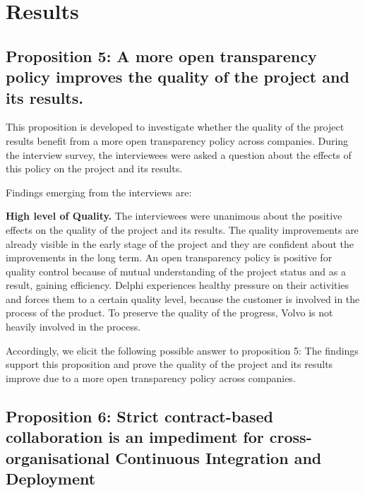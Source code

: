 \section{Results}\label{sec:results}

\subsection{Proposition 5: A more open transparency policy improves the quality of the project and its results.}

This proposition is developed to investigate whether the quality of the project results benefit from a more open transparency policy across companies. During the interview survey, the interviewees were asked a question about the effects of this policy on the project and its results. 

Findings emerging from the interviews are:

{\bf High level of Quality.} The interviewees were unanimous about the positive effects on the quality of the project and its results. The quality improvements are already visible in the early stage of the project and they are confident about the improvements in the long term. An open transparency policy is positive for quality control because of mutual understanding of the project status and as a result, gaining efficiency. Delphi experiences healthy pressure on their activities and forces them to a certain quality level, because the customer is involved in the process of the product. To preserve the quality of the progress, Volvo is not heavily involved in the process.

Accordingly, we elicit the following possible answer to proposition 5:
The findings support this proposition and prove the quality of the project and its results improve due to a more open transparency policy across companies.

\subsection{Proposition 6: Strict contract-based collaboration is an impediment for cross-organisational Continuous Integration and Deployment}

